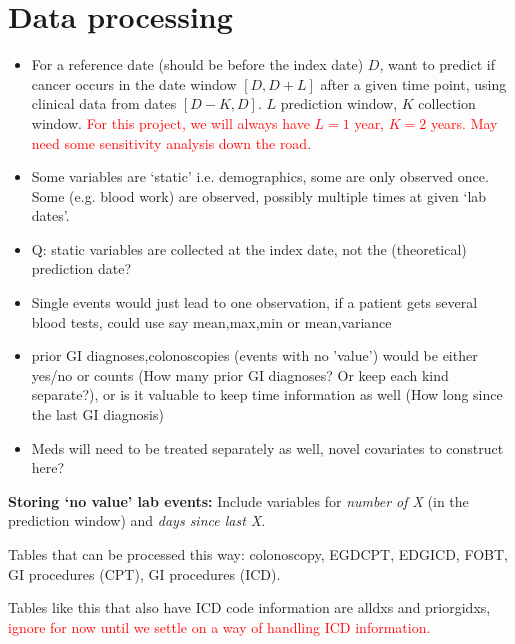 \documentclass[12pt]{article}
\newcommand{\note}[1]{\textcolor{red}{#1}}
\begin{document}
%

\section*{Data processing}

\begin{itemize}
  \item For a reference date (should be before the index date) $D$, want to predict if cancer occurs in the date window $[D,D+L]$ after a given time point, using clinical data from dates $[D-K,D]$. $L$ prediction window, $K$ collection window. \note{For this project, we will always have $L=1$ year, $K=2$ years. May need some sensitivity analysis down the road.}
  \item Some variables are `static' i.e. demographics, some are only observed once. Some (e.g. blood work) are observed, possibly multiple times at given `lab dates'.
  \item Q: static variables are collected at the index date, not the (theoretical) prediction date?
  \item Single events would just lead to one observation, if a patient gets several blood tests, could use say mean,max,min or mean,variance
  \item prior GI diagnoses,colonoscopies (events with no 'value') would be either yes/no or counts (How many prior GI diagnoses? Or keep each kind separate?), or is it valuable to keep time information as well (How long since the last GI diagnosis)
  \item Meds will need to be treated separately as well, novel covariates to construct here?
\end{itemize}

{\bf Storing `no value' lab events:} Include variables for {\em number of X} (in the prediction window) and {\em days since last X}.

Tables that can be processed this way: colonoscopy, EGDCPT, EDGICD, FOBT, GI procedures (CPT), GI procedures (ICD).

Tables like this that also have ICD code information are alldxs and priorgidxs, \note{ignore for now until we settle on a way of handling ICD information.}
\end{document}
